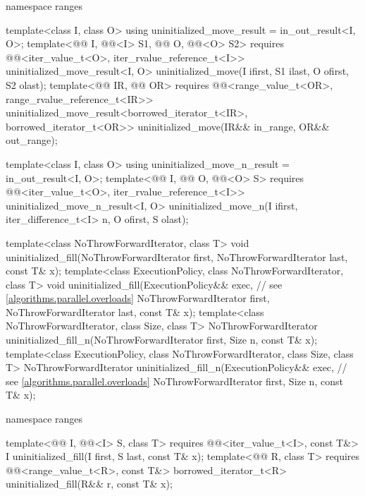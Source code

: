 \begin{codeblock}
{  namespace ranges {
    template<class I, class O>
      using uninitialized_move_result = in_out_result<I, O>;
    template<@@ I, @@<I> S1,
             @@ O, @@<O> S2>
      requires @@<iter_value_t<O>, iter_rvalue_reference_t<I>>
        uninitialized_move_result<I, O>
          uninitialized_move(I ifirst, S1 ilast, O ofirst, S2 olast);
    template<@@ IR, @@ OR>
      requires @@<range_value_t<OR>, range_rvalue_reference_t<IR>>
        uninitialized_move_result<borrowed_iterator_t<IR>, borrowed_iterator_t<OR>>
          uninitialized_move(IR&& in_range, OR&& out_range);

    template<class I, class O>
      using uninitialized_move_n_result = in_out_result<I, O>;
    template<@@ I,
             @@ O, @@<O> S>
      requires @@<iter_value_t<O>, iter_rvalue_reference_t<I>>
        uninitialized_move_n_result<I, O>
          uninitialized_move_n(I ifirst, iter_difference_t<I> n, O ofirst, S olast);
  }

  template<class NoThrowForwardIterator, class T>
    void uninitialized_fill(NoThrowForwardIterator first, NoThrowForwardIterator last,
                            const T& x);
  template<class ExecutionPolicy, class NoThrowForwardIterator, class T>
    void uninitialized_fill(ExecutionPolicy&& exec,             // see \ref{algorithms.parallel.overloads}
                            NoThrowForwardIterator first, NoThrowForwardIterator last,
                            const T& x);
  template<class NoThrowForwardIterator, class Size, class T>
    NoThrowForwardIterator
      uninitialized_fill_n(NoThrowForwardIterator first, Size n, const T& x);
  template<class ExecutionPolicy, class NoThrowForwardIterator, class Size, class T>
    NoThrowForwardIterator
      uninitialized_fill_n(ExecutionPolicy&& exec,              // see \ref{algorithms.parallel.overloads}
                           NoThrowForwardIterator first, Size n, const T& x);

  namespace ranges {
    template<@@ I, @@<I> S, class T>
      requires @@<iter_value_t<I>, const T&>
        I uninitialized_fill(I first, S last, const T& x);
    template<@@ R, class T>
      requires @@<range_value_t<R>, const T&>
        borrowed_iterator_t<R> uninitialized_fill(R&& r, const T& x);

}}
\end{codeblock}
